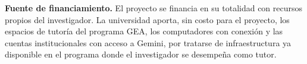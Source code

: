 \textbf{Fuente de financiamiento.} El proyecto se financia en su totalidad con recursos propios del investigador. La universidad aporta, sin costo para el proyecto, los espacios de tutoría del programa GEA, los computadores con conexión y las cuentas institucionales con acceso a Gemini, por tratarse de infraestructura ya disponible en el programa donde el investigador se desempeña como tutor.

